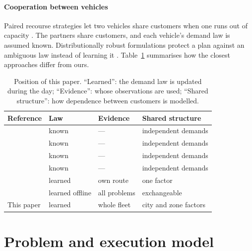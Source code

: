 \documentclass[preprint,authoryear,12pt]{elsarticle}
\begin{document}
\paragraph{Cooperation between vehicles} Paired recourse strategies let
two vehicles share customers when one runs out of capacity
\citep{ak2007paired,zhu2014paired}. The partners share customers, and
each vehicle's demand law is assumed known. Distributionally robust
formulations protect a plan against an ambiguous law instead of
learning it \citep{ghosal2020dro}. Table~\ref{tab:position} summarises
how the closest approaches differ from ours.

\begin{table}[t]
\centering\footnotesize
\caption{Position of this paper. ``Learned'': the demand law is updated
during the day; ``Evidence'': whose observations are used; ``Shared
structure'': how dependence between customers is modelled.}
\label{tab:position}
\begin{tabular}{llll}
\toprule
Reference & Law & Evidence & Shared structure \\
\midrule
\citet{yang2000restocking} & known & --- & independent demands \\
\citet{secomandi2009reopt} & known & --- & independent demands \\
\citet{goodson2013rollout} & known & --- & independent demands \\
\citet{ak2007paired} & known & --- & independent demands \\
\citet{florio2023bayesian} & learned & own route & one factor \\
\citet{gupta2022pooling} & learned offline & all problems & exchangeable \\
This paper & learned & whole fleet & city and zone factors \\
\bottomrule
\end{tabular}
\end{table}

\section{Problem and execution model}\label{sec:model}
\end{document}
